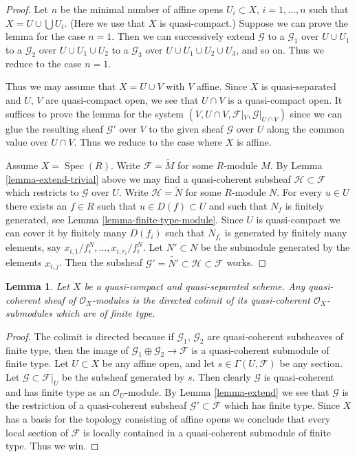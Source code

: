\documentclass{stacks-project}
\theoremstyle{plain}
\newtheorem{lemma}[subsection]{Lemma}
\theoremstyle{definition}
\theoremstyle{remark}
\numberwithin{equation}{subsection}
\def\Spec{\mathop{\mathrm{Spec}}}
\begin{document}
\begin{proof}
Let $n$ be the minimal number of affine opens $U_i \subset X$,
$i = 1, \ldots , n$ such that $X = U \cup \bigcup U_i$.
(Here we use that $X$ is quasi-compact.) Suppose
we can prove the lemma for the case $n = 1$. Then we can successively
extend $\mathcal{G}$
to a $\mathcal{G}_1$ over $U \cup U_1$
to a $\mathcal{G}_2$ over $U \cup U_1 \cup U_2$
to a $\mathcal{G}_3$ over $U \cup U_1 \cup U_2 \cup U_3$,
and so on.
Thus we reduce to the case $n = 1$.

\medskip\noindent
Thus we may assume that $X = U \cup V$ with $V$ affine.
Since $X$ is quasi-separated and $U$, $V$ are quasi-compact open,
we see that $U \cap V$ is a quasi-compact open. It suffices to prove the
lemma for the system $(V, U \cap V, \mathcal{F}|_V, \mathcal{G}|_{U \cap V})$
since we can glue the resulting sheaf $\mathcal{G}'$ over $V$
to the given sheaf $\mathcal{G}$ over $U$ along the common value
over $U \cap V$.
Thus we reduce to the case where $X$ is affine.

\medskip\noindent
Assume $X = \Spec(R)$. Write $\mathcal{F} = \widetilde M$
for some $R$-module $M$. By Lemma \ref{lemma-extend-trivial} above we may
find a quasi-coherent subsheaf $\mathcal{H} \subset \mathcal{F}$
which restricts to $\mathcal{G}$ over $U$.
Write $\mathcal{H} = \widetilde N$ for some $R$-module $N$.
For every $u \in U$ there exists an $f \in R$ such that
$u \in D(f) \subset U$ and such that $N_f$ is finitely generated,
see Lemma \ref{lemma-finite-type-module}.
Since $U$ is quasi-compact we can cover it by finitely
many $D(f_i)$ such that $N_{f_i}$ is generated by
finitely many elements, say $x_{i, 1}/f_i^N, \ldots, x_{i, r_i}/f_i^N$.
Let $N' \subset N$ be the submodule generated by the elements
$x_{i, j}$. Then the subsheaf
$\mathcal{G}' = \widetilde{N'} \subset \mathcal{H} \subset \mathcal{F}$
works.
\end{proof}

\begin{lemma}
\label{lemma-quasi-coherent-colimit-finite-type}
Let $X$ be a quasi-compact and quasi-separated scheme.
Any quasi-coherent sheaf of $\mathcal{O}_X$-modules
is the directed colimit of its quasi-coherent
$\mathcal{O}_X$-submodules which are of finite type.
\end{lemma}

\begin{proof}
The colimit is directed because if $\mathcal{G}_1$, $\mathcal{G}_2$
are quasi-coherent subsheaves of finite type, then the image of
$\mathcal{G}_1 \oplus \mathcal{G}_2 \to \mathcal{F}$ is
a quasi-coherent submodule of finite type.
Let $U \subset X$ be any affine open, and let
$s \in \Gamma(U, \mathcal{F})$ be any section.
Let $\mathcal{G} \subset \mathcal{F}|_U$ be the
subsheaf generated by $s$. Then clearly $\mathcal{G}$
is quasi-coherent and has finite type as an $\mathcal{O}_U$-module.
By Lemma \ref{lemma-extend} we see that $\mathcal{G}$ is the restriction
of a quasi-coherent subsheaf $\mathcal{G}' \subset \mathcal{F}$
which has finite type. Since $X$ has a basis for the topology consisting
of affine opens we conclude that every local section of
$\mathcal{F}$ is locally contained in a quasi-coherent submodule
of finite type. Thus we win.
\end{proof}
\end{document}
